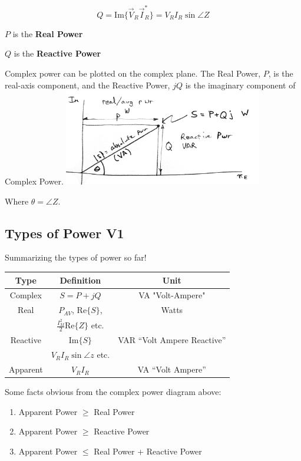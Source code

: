 \[
Q = \text{Im}\{\vec{V}_R \vec{I}_R^*\} = V_R I_R \sin \angle Z
\]

$P$ is the {\bf Real Power}

$Q$ is the {\bf Reactive Power}

Complex power can be plotted on the complex plane.  The Real Power, $P$, is
the real-axis component, and the Reactive Power, $jQ$ is the imaginary component
of Complex Power.
\includegraphics[width=0.65\textwidth]{figsChapt03/A69D31.png}

Where $\theta = \angle{Z}$.

\subsection{Types of Power  V1}
Summarizing the types of power so far!

\begin{center}
\begin{tabular}{|c|c|c|}
\hline
Type & Definition & Unit \\
\hline
Complex  & $S=P+jQ$   &  VA "Volt-Ampere"  \\
Real & $P_{AV}$, $\text{Re}\{S\}$, & Watts \\
 & $\frac{I_M^2}{2} \text{Re}\{Z\}$ etc. & \\
\hline
Reactive & $\text{Im}\{S\}$ & VAR ``Volt Ampere Reactive'' \\
 & $V_R I_R \sin \angle z$ etc. & \\
\hline
Apparent & $V_R I_R$ & VA ``Volt Ampere'' \\
\hline
\end{tabular}
\end{center}

Some facts obvious from the complex power diagram above:
\begin{enumerate}
\item Apparent Power $\geq$ Real Power
\item Apparent Power $\geq$ Reactive Power
\item Apparent Power $\leq$ Real Power + Reactive Power
\end{enumerate}








